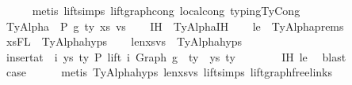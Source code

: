 \begin{isabellebody}
\ \ \ \ \isamarkupfalse%
\ {\isacharparenleft}{\kern0pt}metis\ lift{\isachardot}{\kern0pt}simps{\isacharparenleft}{\kern0pt}{}{\isacharparenright}{\kern0pt}\ lift{\isacharunderscore}{\kern0pt}graph{\isacharunderscore}{\kern0pt}cong\ local{\isachardot}{\kern0pt}cong\ typing{\isachardot}{\kern0pt}TyCong{\isacharparenright}{\kern0pt}\isanewline
\isanewline
{}\isamarkupfalse%
\isanewline
\ \ \isamarkupfalse%
\ {\isacharparenleft}{\kern0pt}TyAlpha\ {\isasymGamma}{}\ P\ g\ ty\ xs\ vs{\isacharparenright}{\kern0pt}\isanewline
\ \ \isamarkupfalse%
\ IH\ {\isacharequal}{\kern0pt}\ TyAlpha{\isachardot}{\kern0pt}IH\isanewline
\ \ \isamarkupfalse%
\ le\ {\isacharequal}{\kern0pt}\ TyAlpha{\isachardot}{\kern0pt}prems{\isacharparenleft}{\kern0pt}{}{\isacharparenright}{\kern0pt}\isanewline
\ \ \isamarkupfalse%
\ xs{\isacharunderscore}{\kern0pt}FL\ {\isacharequal}{\kern0pt}\ TyAlpha{\isachardot}{\kern0pt}hyps{\isacharparenleft}{\kern0pt}{}{\isacharparenright}{\kern0pt}\isanewline
\ \ \isamarkupfalse%
\ len{\isacharunderscore}{\kern0pt}xs{\isacharunderscore}{\kern0pt}vs\ {\isacharequal}{\kern0pt}\ TyAlpha{\isachardot}{\kern0pt}hyps{\isacharparenleft}{\kern0pt}{}{\isacharparenright}{\kern0pt}\isanewline
\isanewline
\ \ \isamarkupfalse%
\ {\isachardoublequoteopen}insert{\isacharunderscore}{\kern0pt}at\ {\isasymGamma}{}\ i\ {\isacharparenleft}{\kern0pt}ys{\isacharcomma}{\kern0pt}\ ty{}{\isacharprime}{\kern0pt}{\isacharparenright}{\kern0pt}\ {\isasymturnstile}{\isacharbraceleft}{\kern0pt}P{\isacharbraceright}{\kern0pt}\ lift\ i\ {\isacharparenleft}{\kern0pt}Graph\ g{\isacharparenright}{\kern0pt}\ {\isacharcolon}{\kern0pt}\ ty{\isachardoublequoteclose}\ \ ys\ ty{}{\isacharprime}{\kern0pt}\isanewline
\ \ \ \ \ \ \isamarkupfalse%
\ IH\ le\ \isamarkupfalse%
\ blast\isanewline
\isanewline
\ \ \isanewline
\isanewline
\ \ \isamarkupfalse%
\ \isamarkupfalse%
\ {\isacharquery}{\kern0pt}case\isanewline
\ \ \ \ \isamarkupfalse%
\ {\isacharparenleft}{\kern0pt}metis\ TyAlpha{\isachardot}{\kern0pt}hyps{\isacharparenleft}{\kern0pt}{}{\isacharcomma}{\kern0pt}{}{\isacharcomma}{\kern0pt}{}{\isacharparenright}{\kern0pt}\ len{\isacharunderscore}{\kern0pt}xs{\isacharunderscore}{\kern0pt}vs\ lift{\isachardot}{\kern0pt}simps{\isacharparenleft}{\kern0pt}{}{\isacharparenright}{\kern0pt}\ lift{\isacharunderscore}{\kern0pt}graph{\isacharunderscore}{\kern0pt}freelinks\isanewline

\end{isabellebody}
